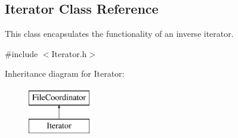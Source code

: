 \hypertarget{class_iterator}{\subsection{Iterator Class Reference}
\label{class_iterator}
}


This class encapsulates the functionality of an inverse iterator.  




{\ttfamily \#include $<$Iterator.\+h$>$}

Inheritance diagram for Iterator\+:\begin{figure}[H]
\begin{center}
\leavevmode
\includegraphics[height=2.000000cm]{class_iterator}
\end{center}
\end{figure}
